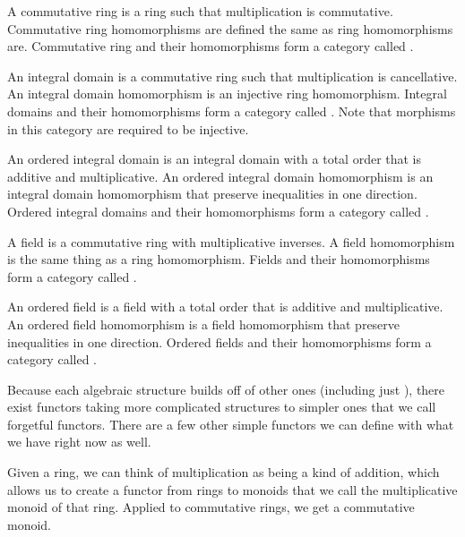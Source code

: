 \documentclass[../../math.tex]{subfiles}
\begin{document}
\begin{definition}
    A commutative ring is a ring such that multiplication is commutative.
    Commutative ring homomorphisms are defined the same as ring homomorphisms
    are.  Commutative ring and their homomorphisms form a category called
    .
\end{definition}

\begin{definition}
    An integral domain is a commutative ring such that multiplication is
    cancellative.  An integral domain homomorphism is an injective ring
    homomorphism.  Integral domains and their homomorphisms form a category
    called .  Note that morphisms in this category are required to
    be injective.
\end{definition}

\begin{definition}
    An ordered integral domain is an integral domain with a total order that is
    additive and multiplicative.  An ordered integral domain homomorphism is an
    integral domain homomorphism that preserve inequalities in one direction.
    Ordered integral domains and their homomorphisms form a category called
    .
\end{definition}

\begin{definition}
    A field is a commutative ring with multiplicative inverses.  A field
    homomorphism is the same thing as a ring homomorphism.  Fields and their
    homomorphisms form a category called .
\end{definition}

\begin{definition}
    An ordered field is a field with a total order that is additive and
    multiplicative.  An ordered field homomorphism is a field homomorphism that
    preserve inequalities in one direction.  Ordered fields and their
    homomorphisms form a category called .
\end{definition}

Because each algebraic structure builds off of other ones (including just
\Type), there exist functors taking more complicated structures to simpler ones
that we call forgetful functors.  There are a few other simple functors we can
define with what we have right now as well.

\begin{definition}
    Given a ring, we can think of multiplication as being a kind of addition,
    which allows us to create a functor from rings to monoids that we call the
    multiplicative monoid of that ring.  Applied to commutative rings, we get a
    commutative monoid.
\end{definition}
\end{document}
